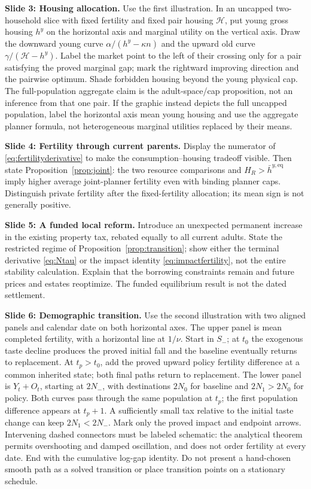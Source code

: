 \documentclass[11pt]{article}
\newcommand{\eq}{\mathrm{eq}}
\begin{document}
\textbf{Slide 3: Housing allocation.} Use the first illustration. In an uncapped two-household slice with fixed fertility and fixed pair housing $\mathcal H$, put young gross housing $h^y$ on the horizontal axis and marginal utility on the vertical axis. Draw the downward young curve $\alpha/(h^y-\kappa n)$ and the upward old curve $\gamma/(\mathcal H-h^y)$. Label the market point to the left of their crossing only for a pair satisfying the proved marginal gap; mark the rightward improving direction and the pairwise optimum. Shade forbidden housing beyond the young physical cap. The full-population aggregate claim is the adult-space/cap proposition, not an inference from that one pair. If the graphic instead depicts the full uncapped population, label the horizontal axis mean young housing and use the aggregate planner formula, not heterogeneous marginal utilities replaced by their means.

\textbf{Slide 4: Fertility through current parents.} Display the numerator of \eqref{eq:fertilityderivative} to make the consumption--housing tradeoff visible. Then state Proposition~\ref{prop:joint}: the two resource comparisons and $H_R>\bar h^{y,\eq}$ imply higher average joint-planner fertility even with binding planner caps. Distinguish private fertility after the fixed-fertility allocation; its mean sign is not generally positive.

\textbf{Slide 5: A funded local reform.} Introduce an unexpected permanent increase in the existing property tax, rebated equally to all current adults. State the restricted regime of Proposition~\ref{prop:transition}; show either the terminal derivative \eqref{eq:Ntau} or the impact identity \eqref{eq:impactfertility}, not the entire stability calculation. Explain that the borrowing constraints remain and future prices and estates reoptimize. The funded equilibrium result is not the dated settlement.

\textbf{Slide 6: Demographic transition.} Use the second illustration with two aligned panels and calendar date on both horizontal axes. The upper panel is mean completed fertility, with a horizontal line at $1/\nu$. Start in $S_-$; at $t_0$ the exogenous taste decline produces the proved initial fall and the baseline eventually returns to replacement. At $t_p>t_0$, add the proved upward policy fertility difference at a common inherited state; both final paths return to replacement. The lower panel is $Y_t+O_t$, starting at $2N_-$, with destinations $2N_0$ for baseline and $2N_1>2N_0$ for policy. Both curves pass through the same population at $t_p$; the first population difference appears at $t_p+1$. A sufficiently small tax relative to the initial taste change can keep $2N_1<2N_-$. Mark only the proved impact and endpoint arrows. Intervening dashed connectors must be labeled schematic: the analytical theorem permits overshooting and damped oscillation, and does not order fertility at every date. End with the cumulative log-gap identity. Do not present a hand-chosen smooth path as a solved transition or place transition points on a stationary schedule.
\end{document}
